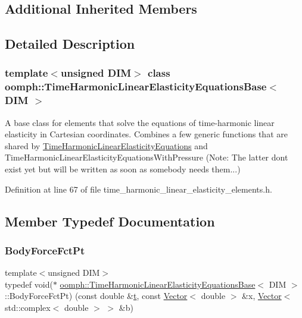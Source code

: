 \subsection*{Additional Inherited Members}


\subsection{Detailed Description}
\subsubsection*{template$<$unsigned D\+IM$>$\newline
class oomph\+::\+Time\+Harmonic\+Linear\+Elasticity\+Equations\+Base$<$ D\+I\+M $>$}

A base class for elements that solve the equations of time-\/harmonic linear elasticity in Cartesian coordinates. Combines a few generic functions that are shared by \hyperlink{classoomph_1_1TimeHarmonicLinearElasticityEquations}{Time\+Harmonic\+Linear\+Elasticity\+Equations} and Time\+Harmonic\+Linear\+Elasticity\+Equations\+With\+Pressure (Note\+: The latter don\textquotesingle{}t exist yet but will be written as soon as somebody needs them...) 

Definition at line 67 of file time\+\_\+harmonic\+\_\+linear\+\_\+elasticity\+\_\+elements.\+h.



\subsection{Member Typedef Documentation}
\mbox{\label{classoomph_1_1TimeHarmonicLinearElasticityEquationsBase_a8cff2941bd4dc9fd3714c151cf5b6e33}} 
\subsubsection{\texorpdfstring{Body\+Force\+Fct\+Pt}{BodyForceFctPt}}
{\footnotesize\ttfamily template$<$unsigned D\+IM$>$ \\
typedef void($\ast$ \hyperlink{classoomph_1_1TimeHarmonicLinearElasticityEquationsBase}{oomph\+::\+Time\+Harmonic\+Linear\+Elasticity\+Equations\+Base}$<$ D\+IM $>$\+::Body\+Force\+Fct\+Pt) (const double \&\hyperlink{cfortran_8h_af6f0bd3dc13317f895c91323c25c2b8f}{t}, const \hyperlink{classoomph_1_1Vector}{Vector}$<$ double $>$ \&x, \hyperlink{classoomph_1_1Vector}{Vector}$<$ std\+::complex$<$ double $>$ $>$ \&b)}



